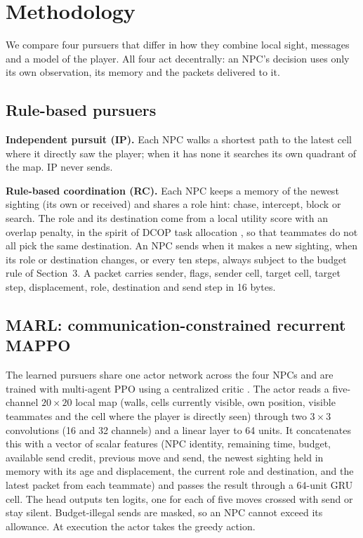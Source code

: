 \documentclass{article}
\begin{document}
\section{Methodology}
We compare four pursuers that differ in how they combine local sight, messages and a model of the player. All four act decentrally: an NPC's decision uses only its own observation, its memory and the packets delivered to it.

\subsection{Rule-based pursuers}
\textbf{Independent pursuit (IP).} Each NPC walks a shortest path to the latest cell where it directly saw the player; when it has none it searches its own quadrant of the map. IP never sends.

\textbf{Rule-based coordination (RC).} Each NPC keeps a memory of the newest sighting (its own or received) and shares a role hint: chase, intercept, block or search. The role and its destination come from a local utility score with an overlap penalty, in the spirit of DCOP task allocation \citep{fioretto2018}, so that teammates do not all pick the same destination. An NPC sends when it makes a new sighting, when its role or destination changes, or every ten steps, always subject to the budget rule of Section~3. A packet carries sender, flags, sender cell, target cell, target step, displacement, role, destination and send step in 16 bytes.

\subsection{MARL: communication-constrained recurrent MAPPO}
The learned pursuers share one actor network across the four NPCs and are trained with multi-agent PPO using a centralized critic \citep{yu2022}. The actor reads a five-channel $20\times20$ local map (walls, cells currently visible, own position, visible teammates and the cell where the player is directly seen) through two $3\times3$ convolutions (16 and 32 channels) and a linear layer to 64 units. It concatenates this with a vector of scalar features (NPC identity, remaining time, budget, available send credit, previous move and send, the newest sighting held in memory with its age and displacement, the current role and destination, and the latest packet from each teammate) and passes the result through a 64-unit GRU cell. The head outputs ten logits, one for each of five moves crossed with send or stay silent. Budget-illegal sends are masked, so an NPC cannot exceed its allowance. At execution the actor takes the greedy action.
\end{document}
